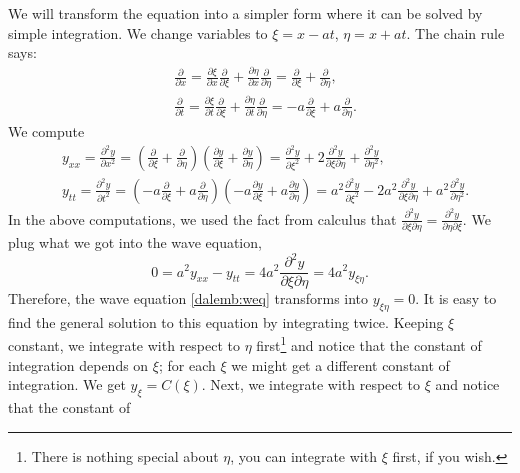 We will transform the equation into a simpler form where it can be solved by
simple integration.
We change variables to $\xi = x - at$, $\eta = x + at$.
The chain rule says:
\begin{align*}
& \frac{\partial}{\partial x}
=
\frac{\partial \xi}{\partial x}
\frac{\partial}{\partial \xi}
+
\frac{\partial \eta}{\partial x}
\frac{\partial}{\partial \eta}
=
\frac{\partial}{\partial \xi}
+
\frac{\partial}{\partial \eta} , \\
& \frac{\partial}{\partial t}
=
\frac{\partial \xi}{\partial t}
\frac{\partial}{\partial \xi}
+
\frac{\partial \eta}{\partial t}
\frac{\partial}{\partial \eta}
=
-a
\frac{\partial}{\partial \xi}
+
a
\frac{\partial}{\partial \eta} .
\end{align*}
We compute
\begin{align*}
& y_{xx} = \frac{\partial^2 y}{\partial x^2}
=
\left(
\frac{\partial}{\partial \xi}
+
\frac{\partial}{\partial \eta}
\right)
\left(
\frac{\partial y}{\partial \xi}
+
\frac{\partial y}{\partial \eta}
\right)
=
\frac{\partial^2 y}{\partial \xi^2}
+
2 \frac{\partial^2 y}{\partial \xi \partial \eta}
+
\frac{\partial^2 y}{\partial \eta^2} ,
\\
& y_{tt} = \frac{\partial^2 y}{\partial t^2}
=
\left(
-a
\frac{\partial}{\partial \xi}
+ a
\frac{\partial}{\partial \eta}
\right)
\left(
-a
\frac{\partial y}{\partial \xi}
+
a
\frac{\partial y}{\partial \eta}
\right)
=
a^2
\frac{\partial^2 y}{\partial \xi^2}
-
2 a^2 \frac{\partial^2 y}{\partial \xi \partial \eta}
+
a^2
\frac{\partial^2 y}{\partial \eta^2} .
\end{align*}
In the above computations, we used the fact from calculus that
$\frac{\partial^2 y}{\partial \xi \partial \eta} = 
\frac{\partial^2 y}{\partial \eta \partial \xi}$.
We plug what we got into the wave equation,
\begin{equation*}
0 = a^2 y_{xx} - y_{tt} =
4 a^2 \frac{\partial^2 y}{\partial \xi \partial \eta} = 4 a^2 y_{\xi\eta} .
\end{equation*}
Therefore, the wave equation \eqref{dalemb:weq} transforms into
$y_{\xi\eta} = 0$.
It is easy to find the general solution to this equation by integrating
twice.  Keeping $\xi$ constant, we integrate with respect to $\eta$
first\footnote{There is nothing special about $\eta$, you can integrate with
$\xi$ first, if you wish.}
and notice that
the constant of integration depends on $\xi$; for each $\xi$ we might get a
different constant of integration.  We get
$y_{\xi} = C(\xi)$.
Next, we integrate with respect to $\xi$ and notice that the constant of

